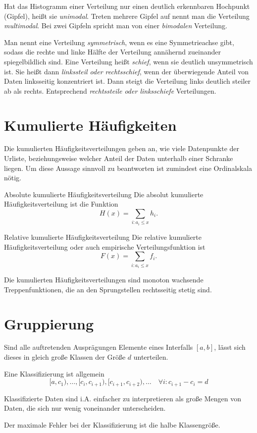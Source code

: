 Hat das Histogramm einer Verteilung nur einen deutlich erkennbaren Hochpunkt (Gipfel), heißt sie \emph{unimodal}. Treten mehrere Gipfel auf nennt man die Verteilung \emph{multimodal}. Bei zwei Gipfeln spricht man von einer \emph{bimodalen} Verteilung.

Man nennt eine Verteilung \emph{symmetrisch}, wenn es eine Symmetrieachse gibt, sodass die rechte und linke Hälfte der Verteilung annähernd zueinander spiegelbildlich sind. 
Eine Verteilung heißt \emph{schief}, wenn sie deutlich unsymmetrisch ist. Sie heißt dann \emph{linkssteil oder rechtsschief}, wenn der überwiegende Anteil von Daten linksseitig konzentriert ist. Dann steigt die Verteilung links deutlich steiler ab als rechts. Entsprechend \emph{rechtssteile oder linksschiefe} Verteilungen.


\section{Kumulierte Häufigkeiten}
Die kumulierten Häufigkeitsverteilungen geben an, wie viele Datenpunkte der Urliste, beziehungsweise welcher Anteil der Daten unterhalb einer Schranke liegen. Um diese Aussage sinnvoll zu beantworten ist zumindest eine Ordinalskala nötig.

\begin{definition}{Absolute kumulierte Häufigkeitsverteilung}
	Die absolut kumulierte Häufigkeitsverteilung ist die Funktion
	\begin{equation*}
		H(x)=\sum\limits_{i:a_i\leq x} h_i.
	\end{equation*}
\end{definition}
\begin{definition}{Relative kumulierte Häufigkeitsverteilung}
	Die relative kumulierte Häufigkeitsverteilung oder auch empirische Verteilungsfunktion ist
	\begin{equation*}
		F(x)=\sum\limits_{i:a_i\leq x} f_i.
	\end{equation*}
\end{definition}
Die kumulierten Häufigkeitsverteilungen sind monoton wachsende Treppenfunktionen, die an den Sprungstellen rechtsseitig stetig sind.



\section{Gruppierung}
Sind alle auftretenden Ausprägungen Elemente eines Interfalls $[a,b]$, lässt sich dieses in gleich große Klassen der Größe $d$ unterteilen.

Eine Klassifizierung ist allgemein
\begin{equation*}
	[a, c_1), \ldots, [c_i,c_{i+1}), [c_{i+1},c_{i+2}), \ldots\quad \forall i: c_{i+1}-c_i=d
\end{equation*}

Klassifizierte Daten sind i.A. einfacher zu interpretieren als große Mengen von Daten, die sich nur wenig voneinander unterscheiden.

Der maximale Fehler bei der Klassifizierung ist die halbe Klassengröße.




